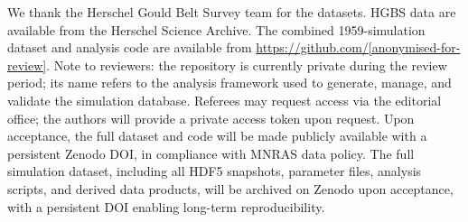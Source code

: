\documentclass[twoside,twocolumn]{mnras}
\begin{document}
We thank the Herschel Gould Belt Survey team for the datasets. HGBS data are available
from the Herschel Science Archive. The combined 1959-simulation dataset and analysis code are available from
\url{https://github.com/[anonymised-for-review]}. Note to reviewers: the repository is currently private during the review period; its name refers to the analysis framework used to generate, manage, and validate the simulation database.
Referees may request access via the editorial office; the authors will provide a
private access token upon request. Upon acceptance, the full dataset and code will
be made publicly available with a persistent Zenodo DOI, in compliance with MNRAS
data policy. The full simulation
dataset, including all HDF5 snapshots, parameter files, analysis scripts, and derived
data products, will be archived on Zenodo upon acceptance, with a persistent DOI enabling
long-term reproducibility.



\end{document}
